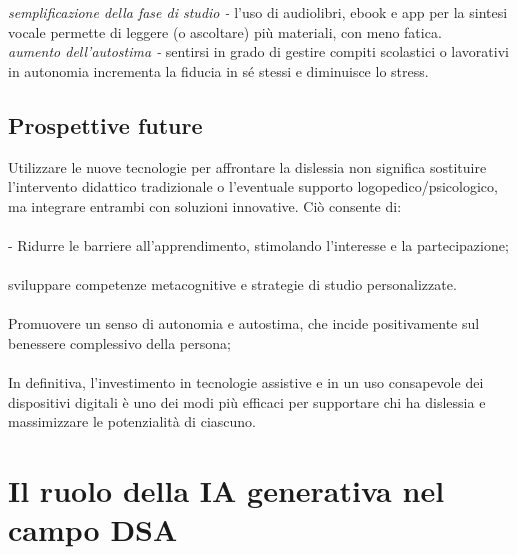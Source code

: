 \documentclass[14pt]{extbook}
\begin{document}
\textit{semplificazione della fase di studio -} l’uso di audiolibri, ebook e app per la sintesi vocale permette di leggere (o ascoltare) più materiali, con meno fatica.\\

\textit{aumento dell’autostima -} sentirsi in grado di gestire compiti scolastici o lavorativi in autonomia incrementa la fiducia in sé stessi e diminuisce lo stress.\\

\subsection{Prospettive future}
Utilizzare le nuove tecnologie per affrontare la dislessia non significa sostituire l’intervento didattico tradizionale o l’eventuale supporto logopedico/psicologico, ma integrare entrambi con soluzioni innovative. Ciò consente di:\\\\
- Ridurre le barriere all’apprendimento, stimolando l’interesse e la partecipazione;\\\\
sviluppare competenze metacognitive e strategie di studio personalizzate.\\\\
Promuovere un senso di autonomia e autostima, che incide positivamente sul benessere complessivo della persona;\\\\
In definitiva, l’investimento in tecnologie assistive e in un uso consapevole dei dispositivi digitali è uno dei modi più efficaci per supportare chi ha dislessia e massimizzare le potenzialità di ciascuno.\\

\pagebreak
\section{Il ruolo della IA generativa nel campo DSA}
\end{document}
